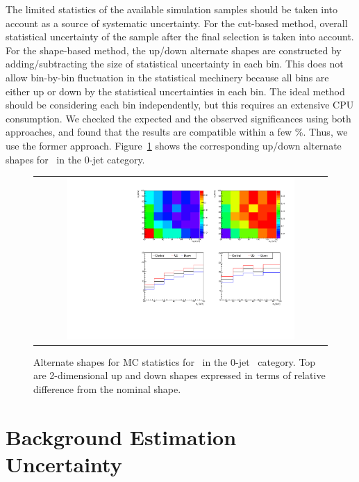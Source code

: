 The limited statistics of the available simulation samples should be taken 
into account as a source of systematic uncertainty. 
For the cut-based method, overall statistical uncertainty of the sample 
after the final selection is taken into account. 
For the shape-based method, the up/down alternate shapes are constructed 
by adding/subtracting the size of statistical uncertainty in each bin. 
This does not allow bin-by-bin fluctuation in the statistical mechinery 
because all bins are either up or down by the statistical uncertainties 
in each bin. The ideal method should be considering each bin independently,
but this requires an extensive CPU consumption. 
We checked the expected and the observed significances using both approaches,
and found that the results are compatible within a few \%. 
Thus, we use the former approach. 
Figure~\ref{fig:alter_stat} shows the corresponding up/down alternate shapes
for \ggww\ in the 0-jet category. 
%
\begin{figure}[htp]
\centering
\begin{tabular}{c}
\includegraphics[width=0.8\textwidth]{figures/histo_ggWW_CMS_hww_of_0j_MVAggWWStatBounding_8TeV_0j_zoom.pdf}
\end{tabular}
\caption{Alternate shapes for MC statistics for \ggww\ in the 0-jet \DF\ category. 
         Top are 2-dimensional up and down shapes expressed in terms of relative 
         difference from the nominal shape.}
\label{fig:alter_stat}
\end{figure}



\section{Background Estimation Uncertainty} 

